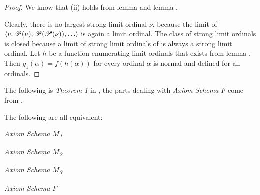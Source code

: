 \begin{proof}
We know that (ii) holds from lemma  and lemma .

Clearly, there is no largest strong limit ordinal $\nu$, because the limit of\\
$\langle \nu, \mathscr{P} (\nu), \mathscr{P} (\mathscr{P} (\nu)), \ldots \rangle$ is again a limit ordinal. %
The class of strong limit ordinals is closed because a limit of strong limit ordinals of is always a strong limit ordinal.
Let $h$ be a function enumerating limit ordinals that exists from lemma .
Then $g_1(\alpha) = f(h(\alpha))$ for every ordinal $\alpha$ is normal and defined for all ordinals.
\end{proof}

The following is \emph{Theorem 1} in \cite{Levy60a}, the parts dealing with \emph{Axiom Schema $F$} come from \cite{DrakeBook}.

\begin{theorem}
The following are all equivalent:
\bce[(i)]
\item \emph{Axiom Schema $M$\textsubscript{1}}
\item \emph{Axiom Schema $M$\textsubscript{2}} 
\item \emph{Axiom Schema $M$\textsubscript{3}} 
\item \emph{Axiom Schema $F$}
\ece
\end{theorem}

